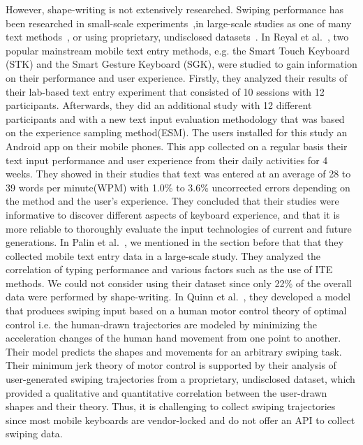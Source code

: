 \documentclass[11pt,oneside,a4paper,openright]{book}
\begin{document}
However, shape-writing is not extensively researched. Swiping performance has been researched in small-scale experiments~\cite{Reyal2015},in large-scale studies as one of many text methods~\cite{Palin19}, or using proprietary, undisclosed datasets~\cite{Quinn18}. In Reyal et al.~\cite{Reyal2015}, two popular mainstream mobile text entry methods, e.g. the Smart Touch Keyboard (STK) and the Smart Gesture Keyboard (SGK), were studied to gain information on their performance and user experience. Firstly, they analyzed their results of their lab-based text entry experiment that consisted of 10 sessions with 12 participants. Afterwards, they did an additional study with 12 different participants and with a new text input evaluation methodology that was based on the experience sampling method(ESM). The users installed for this study an Android app on their mobile phones. This app collected on a regular basis their text input performance and user experience from their daily activities for 4 weeks. They showed in their studies that text was entered at an average of 28 to 39 words per minute(WPM) with 1.0\% to 3.6\% uncorrected errors depending on the method and the user’s experience. They concluded that their studies were informative to discover different aspects of keyboard experience, and that it is more reliable to thoroughly evaluate the input technologies of current and future generations. In Palin et al.~\cite{Palin19}, we mentioned in the section before that that they collected mobile text entry data in a large-scale study. They analyzed the correlation of typing performance and various factors such as the use of ITE methods. We could not consider using their dataset since only 22\% of the overall data were performed by shape-writing. In Quinn et al.~\cite{Quinn18}, they developed a model that produces swiping input based on a human motor control theory of optimal control i.e. the human-drawn trajectories are modeled by minimizing the acceleration changes of the human hand movement from one point to another. Their model predicts the shapes and movements  for an arbitrary swiping task. Their minimum jerk theory of motor control is supported by their analysis of user-generated swiping trajectories from a proprietary, undisclosed dataset, which provided a qualitative and quantitative correlation between the user-drawn shapes and their theory. Thus, it is challenging to collect swiping trajectories since most mobile keyboards are vendor-locked and do not offer an API to collect swiping data.\\
\end{document}
